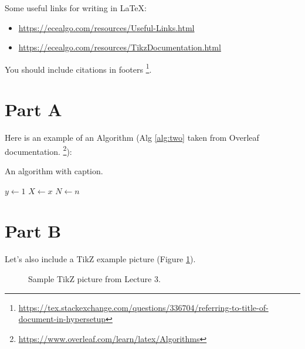 \documentclass[11pt,a4paper]{article}
\begin{document}
	
	Some useful links for writing in LaTeX: 
	\begin{itemize}
		\item \url{https://ecealgo.com/resources/Useful-Links.html}
		\item \url{https://ecealgo.com/resources/TikzDocumentation.html}
	\end{itemize}

	You should include citations in footers \footnote{\url{https://tex.stackexchange.com/questions/336704/referring-to-title-of-document-in-hypersetup}}. 
	
	\section{Part A}
	\lipsum[3]
	Here is an example of an Algorithm (Alg \ref{alg:two} taken from Overleaf documentation. \footnote{\url{https://www.overleaf.com/learn/latex/Algorithms}}): 
	
	\begin{algorithm}
		\caption{An algorithm with caption.}\label{alg:two}
		$y \gets 1$\;
		$X \gets x$\;
		$N \gets n$\;
	\end{algorithm}	
	
	\section{Part B}
	Let's also include a TikZ example picture (Figure \ref{fig:tikz}). 
	
	\begin{figure}
		\centering
		\caption{Sample TikZ picture from Lecture 3.}
		\label{fig:tikz}
	\end{figure}
	
	
	\lipsum[5]
	
	
\end{document}
